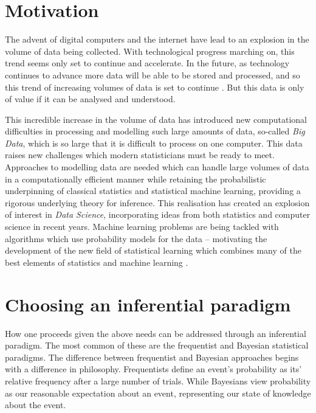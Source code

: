 \section{Motivation}

The advent of digital computers and the internet have lead to an explosion in
the volume of data being collected. With technological progress marching on,
this trend seems only set to continue and accelerate. In the future, as
technology continues to advance more data will be able to be stored and
processed, and so this trend of increasing volumes of data is set to continue
\citep{Gandomi2015}. But this data is only of value if it can be analysed and
understood.

This incredible increase in the volume of data has introduced new computational
difficulties in processing and modelling such large amounts of data, so-called
\emph{Big Data}, which is so large that it is difficult to process on one
computer. This data raises new challenges which modern statisticians must be
ready to meet. Approaches to modelling data are needed which can handle large
volumes of data in a computationally efficient manner while retaining the
probabilistic underpinning of classical statistics and statistical machine
learning, providing a rigorous underlying theory for inference. This realisation
has created an explosion of interest in \emph{Data Science}, incorporating ideas from
both statistics and computer science in recent years. Machine learning problems
are being tackled with algorithms which use probability models for the data --
motivating the development of the new field of statistical learning which
combines many of the best elements of statistics and machine learning
\citep{James:2014:ISL:2517747, MacKay:2002:ITI:971143,
hastie01statisticallearning, Murphy:2012:MLP:2380985}.

\section{Choosing an inferential paradigm}

How one proceeds given the above needs can be addressed through an inferential
paradigm. The most common of these are  the frequentist and Bayesian statistical
paradigms. The difference between frequentist and Bayesian approaches begins
with a difference in philosophy. Frequentists define an event's probability as
its' relative frequency after a large number of trials. While Bayesians view
probability as our reasonable expectation about an event, representing our state
of knowledge about the event.

